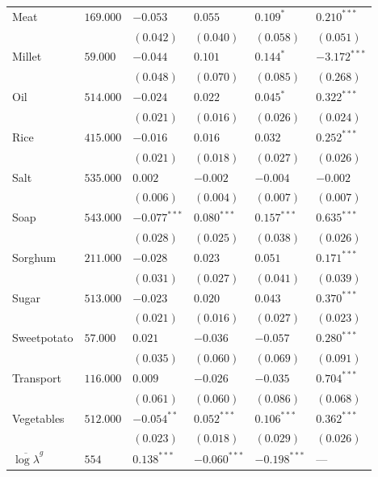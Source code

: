 \documentclass[11pt]{article}
\begin{document}
\begin{table}[htb]
\begin{tabular}{llllll}
Meat & $169.000$ & $-0.053$ & $0.055$ & $0.109^{*}$ & $0.210^{***}$\\
 &  & $(0.042)$ & $(0.040)$ & $(0.058)$ & $(0.051)$\\
Millet & $59.000$ & $-0.044$ & $0.101$ & $0.144^{*}$ & $-3.172^{***}$\\
 &  & $(0.048)$ & $(0.070)$ & $(0.085)$ & $(0.268)$\\
Oil & $514.000$ & $-0.024$ & $0.022$ & $0.045^{*}$ & $0.322^{***}$\\
 &  & $(0.021)$ & $(0.016)$ & $(0.026)$ & $(0.024)$\\
Rice & $415.000$ & $-0.016$ & $0.016$ & $0.032$ & $0.252^{***}$\\
 &  & $(0.021)$ & $(0.018)$ & $(0.027)$ & $(0.026)$\\
Salt & $535.000$ & $0.002$ & $-0.002$ & $-0.004$ & $-0.002$\\
 &  & $(0.006)$ & $(0.004)$ & $(0.007)$ & $(0.007)$\\
Soap & $543.000$ & $-0.077^{***}$ & $0.080^{***}$ & $0.157^{***}$ & $0.635^{***}$\\
 &  & $(0.028)$ & $(0.025)$ & $(0.038)$ & $(0.026)$\\
Sorghum & $211.000$ & $-0.028$ & $0.023$ & $0.051$ & $0.171^{***}$\\
 &  & $(0.031)$ & $(0.027)$ & $(0.041)$ & $(0.039)$\\
Sugar & $513.000$ & $-0.023$ & $0.020$ & $0.043$ & $0.370^{***}$\\
 &  & $(0.021)$ & $(0.016)$ & $(0.027)$ & $(0.023)$\\
Sweetpotato & $57.000$ & $0.021$ & $-0.036$ & $-0.057$ & $0.280^{***}$\\
 &  & $(0.035)$ & $(0.060)$ & $(0.069)$ & $(0.091)$\\
Transport & $116.000$ & $0.009$ & $-0.026$ & $-0.035$ & $0.704^{***}$\\
 &  & $(0.061)$ & $(0.060)$ & $(0.086)$ & $(0.068)$\\
Vegetables & $512.000$ & $-0.054^{**}$ & $0.052^{***}$ & $0.106^{***}$ & $0.362^{***}$\\
 &  & $(0.023)$ & $(0.018)$ & $(0.029)$ & $(0.026)$\\
\hline
$\overline{\log\lambda}^g$ & $554$ & $0.138^{***}$ & $-0.060^{***}$ & $-0.198^{***}$ & ---\\
\end{tabular}
\end{table}
\end{document}
